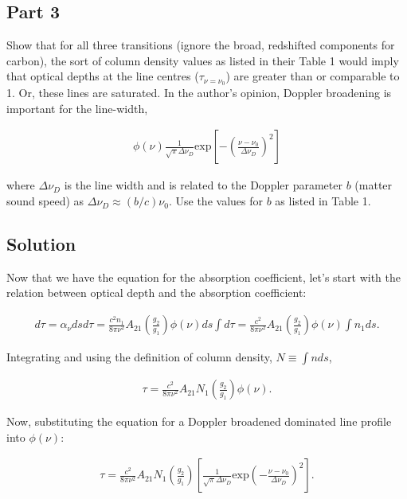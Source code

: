 \documentclass[12pt]{article}
\begin{document}
\subsection*{Part 3}

Show that for all three transitions (ignore the broad, redshifted components for carbon), the sort of column density values as listed in their Table 1 would imply that optical depths at the line centres ($\tau_{\nu = \nu_0}$) are greater than or comparable to 1. Or, these lines are saturated. In the author's opinion, Doppler broadening is important for the line-width,

\begin{align*}
\phi(\nu) \frac{1}{\sqrt{\pi}\Delta\nu_D}\mathrm{exp}\left[-\left(\frac{\nu - \nu_0}{\Delta\nu_D}\right)^2\right]
\end{align*}

where $\Delta\nu_D$ is the line width and is related to the Doppler parameter $b$ (matter sound speed) as $\Delta\nu_D \approx (b/c)\nu_0$. Use the values for $b$ as listed in Table 1.

\subsection*{Solution}

Now that we have the equation for the absorption coefficient, let's start with the relation between optical depth and the absorption coefficient:

\begin{equation*}
\begin{split}
d\tau = \alpha_\nu ds
d\tau = \frac{c^2n_1}{8\pi \nu^2}A_{21}\left(\frac{g_2}{g_1}\right)\phi(\nu)ds
\int d\tau = \frac{c^2}{8\pi \nu^2}A_{21}\left(\frac{g_2}{g_1}\right)\phi(\nu)\int n_1ds.
\end{split}
\end{equation*}

Integrating and using the definition of column density, $N \equiv \int nds$,

\begin{align*}
\tau = \frac{c^2}{8\pi \nu^2}A_{21}N_1\left(\frac{g_2}{g_1}\right)\phi(\nu).
\end{align*}

Now, substituting the equation for a  Doppler broadened dominated line profile into $\phi(\nu)$:

\begin{align*}
\tau = \frac{c^2}{8\pi \nu^2}A_{21}N_1\left(\frac{g_2}{g_1}\right)\left[\frac{1}{\sqrt{\pi}\Delta\nu_D}\mathrm{exp}\left(-\frac{\nu-\nu_0}{\Delta\nu_D}\right)^2\right].
\end{align*}
\end{document}
